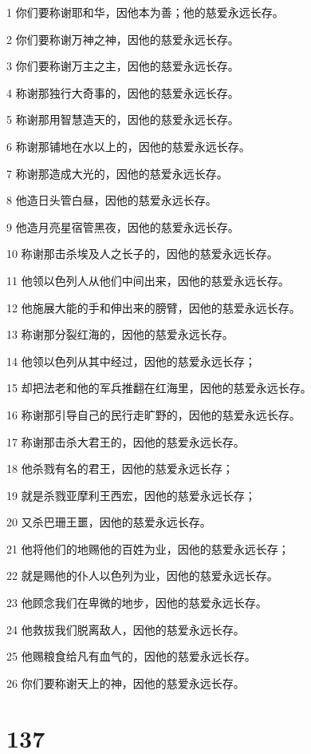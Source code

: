 \par 1 你们要称谢耶和华，因他本为善；他的慈爱永远长存。
\par 2 你们要称谢万神之神，因他的慈爱永远长存。
\par 3 你们要称谢万主之主，因他的慈爱永远长存。
\par 4 称谢那独行大奇事的，因他的慈爱永远长存。
\par 5 称谢那用智慧造天的，因他的慈爱永远长存。
\par 6 称谢那铺地在水以上的，因他的慈爱永远长存。
\par 7 称谢那造成大光的，因他的慈爱永远长存。
\par 8 他造日头管白昼，因他的慈爱永远长存。
\par 9 他造月亮星宿管黑夜，因他的慈爱永远长存。
\par 10 称谢那击杀埃及人之长子的，因他的慈爱永远长存。
\par 11 他领以色列人从他们中间出来，因他的慈爱永远长存。
\par 12 他施展大能的手和伸出来的膀臂，因他的慈爱永远长存。
\par 13 称谢那分裂红海的，因他的慈爱永远长存。
\par 14 他领以色列从其中经过，因他的慈爱永远长存；
\par 15 却把法老和他的军兵推翻在红海里，因他的慈爱永远长存。
\par 16 称谢那引导自己的民行走旷野的，因他的慈爱永远长存。
\par 17 称谢那击杀大君王的，因他的慈爱永远长存。
\par 18 他杀戮有名的君王，因他的慈爱永远长存；
\par 19 就是杀戮亚摩利王西宏，因他的慈爱永远长存；
\par 20 又杀巴珊王噩，因他的慈爱永远长存。
\par 21 他将他们的地赐他的百姓为业，因他的慈爱永远长存；
\par 22 就是赐他的仆人以色列为业，因他的慈爱永远长存。
\par 23 他顾念我们在卑微的地步，因他的慈爱永远长存。
\par 24 他救拔我们脱离敌人，因他的慈爱永远长存。
\par 25 他赐粮食给凡有血气的，因他的慈爱永远长存。
\par 26 你们要称谢天上的神，因他的慈爱永远长存。

\chapter{137}

